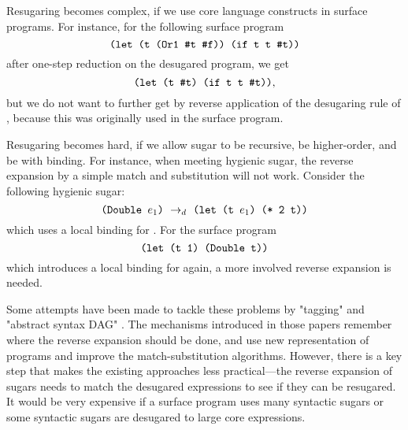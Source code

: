Resugaring becomes complex, if we use core language constructs in  surface programs. For instance, for the following surface program
\[
\texttt{(let (t (Or1 \#t \#f)) (if t t \#t))}
\]
after one-step reduction on the desugared program, we get
\[
\texttt{(let (t \#t) (if t t \#t))},
\]
but we do not want to further get  by reverse application of the desugaring rule of , because this  was originally used in the surface program.

Resugaring becomes hard, if we allow sugar to be recursive, be higher-order, and be with binding.
For instance, when meeting hygienic sugar, the reverse expansion by a simple match and substitution will not work. Consider the following hygienic sugar:
\[
\texttt{(Double $e_1$)} ~\rightarrow_d~ \texttt{(let (t $e_1$) (* 2 t))}
\]
which uses a local binding for . For the surface program
\[
\texttt{(let (t 1) (Double t))}
\]
which introduces a local binding for  again, a more involved reverse expansion is needed.

Some attempts have been made to tackle these problems by "tagging" \cite{resugaring} and "abstract syntax DAG" \cite{hygienic}.
The mechanisms introduced in those papers remember where the reverse expansion should be done, and use new representation of programs and improve the match-substitution algorithms.
However, there is a key step that makes the existing approaches less practical---the reverse expansion of sugars needs to match the desugared expressions to see if they can be resugared. It would be very expensive if a surface program uses many syntactic sugars or some syntactic sugars are desugared to large core expressions.


